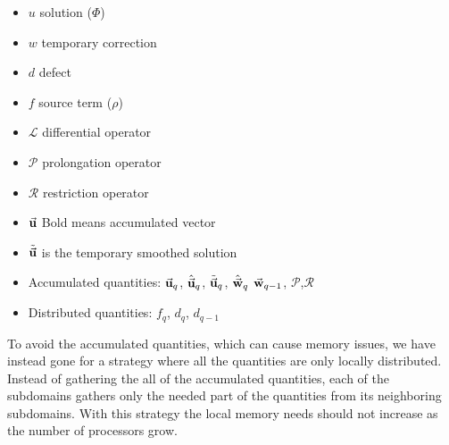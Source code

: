 		\begin{itemize}
			\item \(u\) solution (\(\Phi\))
			\item \(w\) temporary correction
			\item \(d\) defect
			\item \(f\) source term (\(\rho\))
			\item \(\mathcal{L}\) differential operator
			\item \(\mathcal{P}\) prolongation operator
			\item \(\mathcal{R}\) restriction operator
			\item \( \va{u}\) Bold means accumulated vector
			\item \( \tilde{\va{ u }} \) is the temporary smoothed solution
		\end{itemize}

		\begin{itemize}
			\item Accumulated quantities:	\(\va{u}_q\), \( \hat{\va{u}}_q \), \(\tilde{\va{u}}_q\), \(\hat{\va{w}}_q\) \(\va{w}_{q-1}\), \(\mathcal{P}\),\(\mathcal{R}\)
			\item Distributed quantities:  \( f_q \), \(d_q\), \(d_{q-1}\)
		\end{itemize}

		To avoid the accumulated quantities, which can cause memory issues, we have instead
		gone for a strategy where all the quantities are only locally distributed.
		Instead of gathering the all of the accumulated quantities, each of the subdomains
		gathers only the needed part of the quantities from its neighboring subdomains.
		With this strategy the local memory needs should not increase as the number
		of processors grow.



